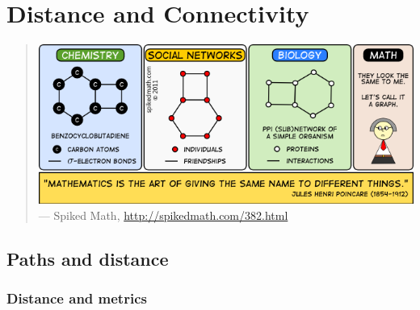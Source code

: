 
\chapter{Distance and Connectivity}
\label{chap:distance_connectivity}

\begin{quote}
\footnotesize
{}
\includegraphics[scale=0.85]{image/distance-connectivity/what-is-math} \\
\noindent
--- Spiked Math,
\url{http://spikedmath.com/382.html}
\end{quote}



\section{Paths and distance}



\subsection{Distance and metrics}

